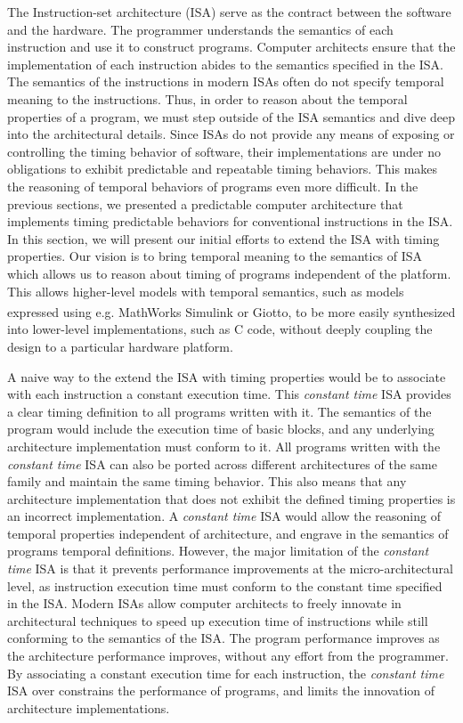 
The Instruction-set architecture (ISA) serve as the contract between the software and the hardware.
The programmer understands the semantics of each instruction and use it to construct programs.
Computer architects ensure that the implementation of each instruction abides to the semantics specified in the ISA.
The semantics of the instructions in modern ISAs often do not specify temporal meaning to the instructions.   
Thus, in order to reason about the temporal properties of a program, we must step outside of the ISA semantics and dive deep into the architectural details.
Since ISAs do not provide any means of exposing or controlling the timing behavior of software, their implementations are under no obligations to exhibit predictable and repeatable timing behaviors.
This makes the reasoning of temporal behaviors of programs even more difficult.  
In the previous sections, we presented a predictable computer architecture that implements timing predictable behaviors for conventional instructions in the ISA. 
In this section, we will present our initial efforts to extend the ISA with timing properties.  
Our vision is to bring temporal meaning to the semantics of ISA which allows us to reason about timing of programs independent of the platform.
This allows higher-level models with temporal semantics, such as models expressed using e.g. MathWorks Simulink\textsuperscript{\textregistered} or Giotto, to be more easily synthesized into lower-level implementations, such as C code, without deeply coupling the design to a particular hardware platform. 

A naive way to the extend the ISA with timing properties would be to associate with each instruction a constant execution time. 
This \emph{constant time} ISA provides a clear timing definition to all programs written with it.
The semantics of the program would include the execution time of basic blocks, and any underlying architecture implementation must conform to it.
All programs written with the \emph{constant time} ISA can also be ported across different architectures of the same family and maintain the same timing behavior.
This also means that any architecture implementation that does not exhibit the defined timing properties is an incorrect implementation.
A \emph{constant time} ISA would allow the reasoning of temporal properties independent of architecture, and engrave in the semantics of programs temporal definitions.     
However, the major limitation of the \emph{constant time} ISA is that it prevents performance improvements at the micro-architectural level, as instruction execution time must conform to the constant time specified in the ISA.
Modern ISAs allow computer architects to freely innovate in architectural techniques to speed up execution time of instructions while still conforming to the semantics of the ISA.  
The program performance improves as the architecture performance improves, without any effort from the programmer. 
By associating a constant execution time for each instruction, the \emph{constant time} ISA over constrains the performance of programs, and limits the innovation of architecture implementations.    

